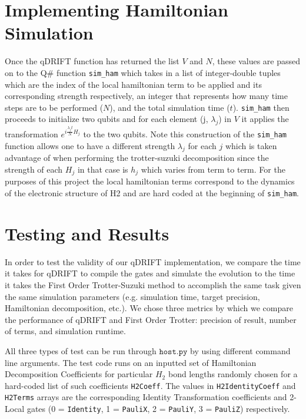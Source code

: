 \documentclass[letterpaper, 11pt]{article}
\begin{document}
\section*{Implementing Hamiltonian Simulation}
Once the qDRIFT function has returned the list $V$ and $N$, these values are passed on to the Q\# function \texttt{sim\_ham} which takes in a list of integer-double tuples which are the index of the local hamiltonian term to be applied and its corresponding strength respectively, an integer that represents how many time steps are to be performed ($N$), and the total simulation time ($t$). \texttt{sim\_ham} then proceeds to initialize two qubits and for each element (j, $\lambda_j$) in $V$ it applies the transformation $e^{i\frac{\lambda_j t}{N} H_j}$ to the two qubits. Note this construction of the \texttt{sim\_ham} function allows one to have a different strength $\lambda_j$ for each $j$ which is taken advantage of when performing the trotter-suzuki decomposition since the strength of each $H_j$ in that case is $h_j$ which varies from term to term. For the purposes of this project the local hamiltonian terms correspond to the dynamics of the electronic structure of H2 and are hard coded at the beginning of \texttt{sim\_ham}.

\section*{Testing and Results}
In order to test the validity of our qDRIFT implementation, we compare the time it takes for qDRIFT to compile the gates and simulate the evolution to the time it takes the First Order Trotter-Suzuki method to accomplish the same task given the same simulation parameters (e.g. simulation time, target precision, Hamiltonian decomposition, etc.). We chose three metrics by which we compare the performance of qDRIFT and First Order Trotter: precision of result, number of terms, and simulation runtime.

All three types of test can be run through $\texttt{host.py}$ by using different command line arguments. The test code runs on an inputted set of Hamiltonian Decomposition Coefficients for particular $H_2$ bond lengths randomly chosen for a hard-coded list of such coefficients \texttt{H2Coeff}. The values in \texttt{H2IdentityCoeff} and \texttt{H2Terms} arrays are the corresponding Identity Transformation coefficients and 2-Local gates (0 = \texttt{Identity}, 1 = \texttt{PauliX}, 2 = \texttt{PauliY}, 3 = \texttt{PauliZ}) respectively.
\end{document}
